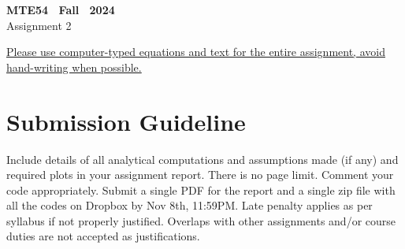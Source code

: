 \documentclass{article}
\begin{document}
\begin{center}
     \textbf{MTE54 \ Fall \ 2024}\\
     Assignment 2
\end{center}



\newpage
\underline{Please use computer-typed equations and text for the entire assignment, avoid hand-writing when possible.}






\section*{Submission Guideline}

Include details of all analytical computations and assumptions made (if any) and required plots in your assignment report. There is no page limit. Comment your code appropriately.
Submit a single PDF for the report and a single zip file with all the codes on Dropbox by Nov 8th, 11:59PM. Late penalty applies as per syllabus if not properly justified. Overlaps with other assignments and/or course duties are not accepted as justifications.
\end{document}
